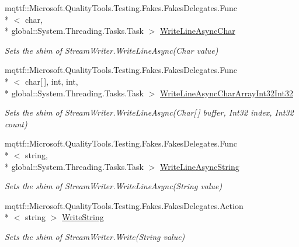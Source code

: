 \begin{DoxyCompactItemize}
mqttf\-::\-Microsoft.\-Quality\-Tools.\-Testing.\-Fakes.\-Fakes\-Delegates.\-Func\\*
$<$ char, \\*
global\-::\-System.\-Threading.\-Tasks.\-Task $>$ \hyperlink{class_system_1_1_i_o_1_1_fakes_1_1_shim_stream_writer_a68aa8f1148344ec97461f7e5c5c508b0}{Write\-Line\-Async\-Char}
\begin{DoxyCompactList}\small\item\em Sets the shim of Stream\-Writer.\-Write\-Line\-Async(\-Char value)\end{DoxyCompactList}\item 
mqttf\-::\-Microsoft.\-Quality\-Tools.\-Testing.\-Fakes.\-Fakes\-Delegates.\-Func\\*
$<$ char\mbox{[}$\,$\mbox{]}, int, int, \\*
global\-::\-System.\-Threading.\-Tasks.\-Task $>$ \hyperlink{class_system_1_1_i_o_1_1_fakes_1_1_shim_stream_writer_ab0a3088e112bcac17de6a38de299bfc0}{Write\-Line\-Async\-Char\-Array\-Int32\-Int32}
\begin{DoxyCompactList}\small\item\em Sets the shim of Stream\-Writer.\-Write\-Line\-Async(\-Char\mbox{[}$\,$\mbox{]} buffer, Int32 index, Int32 count)\end{DoxyCompactList}\item 
mqttf\-::\-Microsoft.\-Quality\-Tools.\-Testing.\-Fakes.\-Fakes\-Delegates.\-Func\\*
$<$ string, \\*
global\-::\-System.\-Threading.\-Tasks.\-Task $>$ \hyperlink{class_system_1_1_i_o_1_1_fakes_1_1_shim_stream_writer_ab5641afb1806d90a52acc86ca822b02c}{Write\-Line\-Async\-String}
\begin{DoxyCompactList}\small\item\em Sets the shim of Stream\-Writer.\-Write\-Line\-Async(\-String value)\end{DoxyCompactList}\item 
mqttf\-::\-Microsoft.\-Quality\-Tools.\-Testing.\-Fakes.\-Fakes\-Delegates.\-Action\\*
$<$ string $>$ \hyperlink{class_system_1_1_i_o_1_1_fakes_1_1_shim_stream_writer_a7a430bee92caa3e241ac77a88535051b}{Write\-String}
\begin{DoxyCompactList}\small\item\em Sets the shim of Stream\-Writer.\-Write(\-String value)\end{DoxyCompactList}\end{DoxyCompactItemize}


